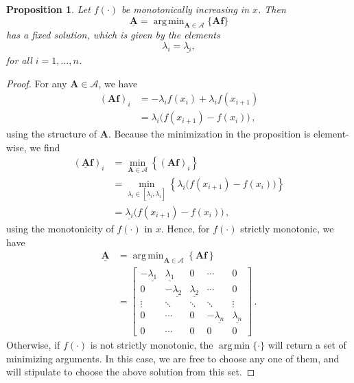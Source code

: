 \documentclass[10pt]{article}
\newtheorem{proposition}[theorem]{Proposition}
\DeclareMathOperator*{\argmin}{arg\,min}
\begin{document}
\begin{proposition}
Let $f(\cdot)$ be monotonically increasing in $x$. Then
\begin{equation*}
\underline{\mathbf{A}} = \argmin_{\mathbf{A}\in\mathcal{A}}\{\mathbf{A}\mathbf{f}\}
\end{equation*}
has a fixed solution, which is given by the elements
\begin{equation*}
\lambda_i = \underline{\lambda_i},
\end{equation*}
for all $i=1,\ldots,n$.
\end{proposition}
\begin{proof}
For any $\mathbf{A}\in\mathcal{A}$, we have
\begin{align*}
\left(\mathbf{A}\mathbf{f}\right)_i &= -\lambda_i f(x_i) + \lambda_i f(x_{i+1}) \\
 &= \lambda_i\bigl(f(x_{i+1})-f(x_i)\bigr)\,,
\end{align*}
using the structure of $\mathbf{A}$. Because the minimization in the proposition is element-wise, we find
\begin{align*}
\left(\underline{\mathbf{A}}\mathbf{f}\right)_i &= \min_{\mathbf{A}\in\mathcal{A}}\left\{ \left(\mathbf{A}\mathbf{f}\right)_i \right\} \\
 &= \min_{\lambda_i\in\left[\underline{\lambda_i},\overline{\lambda_i}\right]}\left\{\lambda_i\bigl(f(x_{i+1})-f(x_i)\bigr)\right\} \\
 &= \underline{\lambda_i}\bigl(f(x_{i+1}) - f(x_i)\bigr)\,,
\end{align*}
using the monotonicity of $f(\cdot)$ in $x$. Hence, for $f(\cdot)$ strictly monotonic, we have
\begin{align*}
\underline{\mathbf{A}} &= \argmin_{\mathbf{A}\in\mathcal{A}}\left\{\mathbf{A}\mathbf{f}\right\} \\
 &= \left[\begin{array}{ccccc}
-\underline{\lambda_1} & \underline{\lambda_1} & 0 & \cdots & 0 \\
0 & -\underline{\lambda_2} & \underline{\lambda_2} & \cdots & 0 \\
\vdots & \ddots & \ddots & \ddots & \vdots \\
0 & \cdots & 0 & -\underline{\lambda_n} & \underline{\lambda_n} \\
0 & \cdots & 0 & 0 & 0
\end{array} \right]\,.
\end{align*}
Otherwise, if $f(\cdot)$ is not strictly monotonic, the $\argmin\{\cdot\}$ will return a set of minimizing arguments. In this case, we are free to choose any one of them, and will stipulate to choose the above solution from this set.
\end{proof}
\end{document}
